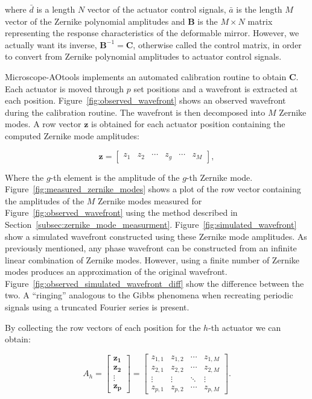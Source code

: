 where $\bar{d}$ is a length $N$ vector of the actuator control signals, 
$\bar{a}$ is the length $M$ vector of the Zernike polynomial amplitudes and 
$\boldsymbol{B}$ is the $M \times N$ matrix representing the response 
characteristics of the deformable mirror. However, we actually want its 
inverse, $\boldsymbol{B}^{-1} =\boldsymbol{C}$, otherwise called the control 
matrix, in order to convert from Zernike polynomial amplitudes to actuator 
control signals.

Microscope-AOtools implements an automated calibration routine to obtain 
$\boldsymbol{C}$. Each actuator is moved through $p$ set positions and a 
wavefront is extracted at each position. Figure~\ref{fig:observed_wavefront} 
shows an observed wavefront during the calibration routine. The wavefront is 
then decomposed into $M$ Zernike modes\cite{townson2019aotools}. A row vector 
$\boldsymbol{z}$ is obtained for each actuator position containing the 
computed Zernike mode amplitudes:

\begin{equation}\label{eq:zernike_amp}
\boldsymbol{z} = 
\begin{bmatrix}
z_{1} & z_{2} & \cdots & z_{g} & \cdots & z_{M}
\end{bmatrix},
\end{equation}

Where the $g$-th element is the amplitude of the $g$-th
Zernike mode. Figure~\ref{fig:measured_zernike_modes} shows
a plot of the row vector containing the amplitudes of the 
$M$ Zernike modes measured for Figure~\ref{fig:observed_wavefront} using the 
method described in Section~\ref{subsec:zernike_mode_measurment}.
Figure~\ref{fig:simulated_wavefront} show a simulated wavefront 
constructed using these Zernike mode amplitudes. As previously 
mentioned, any phase wavefront can be constructed from an 
infinite linear combination of Zernike modes\cite{noll1976zernike}. 
However, using a finite number of Zernike modes produces an 
approximation of the original wavefront. 
Figure~\ref{fig:observed_simulated_wavefront_diff} show the
difference between the two. A ``ringing'' analogous to the 
Gibbs phenomena when recreating periodic signals using a
truncated Fourier series is present\cite{weisstein2003gibbs}.

By collecting the row vectors of each position
for the $h$-th actuator we can obtain:

\begin{equation}\label{eq:zernike_amp_actuator}
A_h = 
\begin{bmatrix}
\boldsymbol{z_{1}}\\
\boldsymbol{z_{2}}\\
\vdots\\
\boldsymbol{z_{p}} 
\end{bmatrix}
=
\begin{bmatrix}
z_{1,1} & z_{1,2} & \cdots & z_{1,M} \\
z_{2,1} & z_{2,2} & \cdots & z_{2,M} \\
\vdots  & \vdots  & \ddots & \vdots  \\
z_{p,1} & z_{p,2} & \cdots & z_{p,M} 
\end{bmatrix}.
\end{equation}

